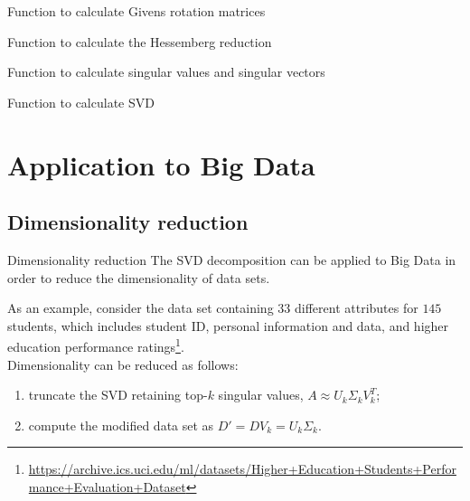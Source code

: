 \documentclass[10pt]{beamer}
\begin{document}
\begin{frame}[fragile]{Function to calculate Givens rotation matrices}
    
\end{frame}

\begin{frame}{Function to calculate the Hessemberg reduction}
    
\end{frame}

\begin{frame}{Function to calculate singular values and singular vectors}
    
\end{frame}

\begin{frame}{Function to calculate SVD}
    
\end{frame}

\section{Application to Big Data}

\subsection{Dimensionality reduction}

\begin{frame}{Dimensionality reduction}
    The SVD decomposition can be applied to Big Data in order to reduce the dimensionality of data sets. \\ \bigskip

    As an example, consider the data set \cite{10.1007/978-3-030-35249-3_76} containing $33$ different attributes for $145$ students, which includes student ID, personal information and data, and higher education performance ratings\footnote{\url{https://archive.ics.uci.edu/ml/datasets/Higher+Education+Students+Performance+Evaluation+Dataset}}. \\
    Dimensionality can be reduced as follows:
    \begin{enumerate}
        \item truncate the SVD retaining top-$k$ singular values, $A \approx U_k \Sigma_k V_k^T$;
        \item compute the modified data set as $D' = D V_k = U_k \Sigma_k$.
    \end{enumerate}
\end{frame}
\end{document}

